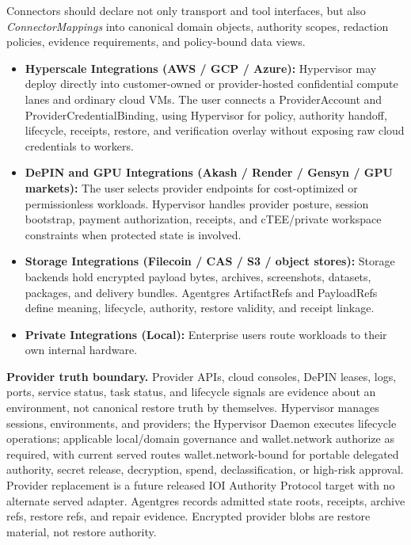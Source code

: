 \documentclass[
  11pt,
]{article}
\providecommand{\tightlist}{%
  \setlength{\itemsep}{0pt}\setlength{\parskip}{0pt}}
\begin{document}
Connectors should declare not only transport and tool interfaces, but
also \emph{ConnectorMappings} into canonical domain objects, authority
scopes, redaction policies, evidence requirements, and policy-bound data
views.

\begin{itemize}
\tightlist
\item
  \textbf{Hyperscale Integrations (AWS / GCP / Azure):} Hypervisor may
  deploy directly into customer-owned or provider-hosted confidential
  compute lanes and ordinary cloud VMs. The user connects a
  ProviderAccount and ProviderCredentialBinding, using Hypervisor for
  policy, authority handoff, lifecycle, receipts, restore, and
  verification overlay without exposing raw cloud credentials to workers.
\item
  \textbf{DePIN and GPU Integrations (Akash / Render / Gensyn / GPU
  markets): }The user selects provider endpoints for cost-optimized or
  permissionless workloads. Hypervisor handles provider posture, session
  bootstrap, payment authorization, receipts, and cTEE/private workspace
  constraints when protected state is involved.
\item
  \textbf{Storage Integrations (Filecoin / CAS / S3 / object stores):}
  Storage backends hold encrypted payload bytes, archives, screenshots,
  datasets, packages, and delivery bundles. Agentgres ArtifactRefs and
  PayloadRefs define meaning, lifecycle, authority, restore validity,
  and receipt linkage.
\item
  \textbf{Private Integrations (Local):} Enterprise users route
  workloads to their own internal hardware.
\end{itemize}

\textbf{Provider truth boundary.} Provider APIs, cloud consoles, DePIN
leases, logs, ports, service status, task status, and lifecycle signals
are evidence about an environment, not canonical restore truth by
themselves. Hypervisor manages sessions, environments, and providers;
the Hypervisor Daemon executes lifecycle operations; applicable
local/domain governance and wallet.network authorize as required, with
current served routes wallet.network-bound for portable delegated authority,
secret release, decryption, spend, declassification, or high-risk approval.
Provider replacement is a future released IOI Authority Protocol target with
no alternate served adapter. Agentgres records admitted state roots, receipts,
archive refs, restore
refs, and repair evidence. Encrypted provider blobs are restore
material, not restore authority.
\end{document}
